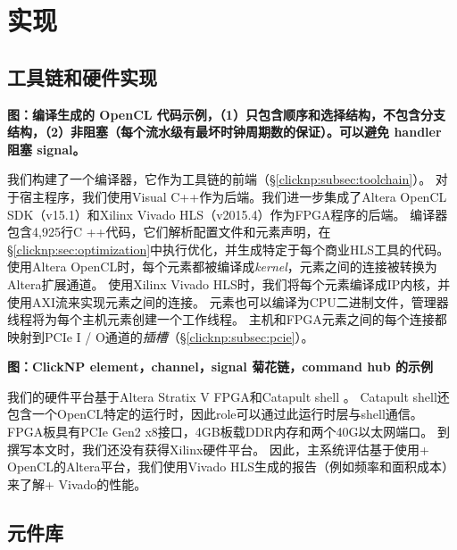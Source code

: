\section{实现}
\label{clicknp:sec:impl}

\subsection{\name 工具链和硬件实现}

\textbf{图：编译生成的 OpenCL 代码示例，（1）只包含顺序和选择结构，不包含分支结构，（2）非阻塞（每个流水级有最坏时钟周期数的保证）。可以避免 handler 阻塞 signal。}

我们构建了一个\name 编译器，它作为\name 工具链的前端（\S \ref {clicknp:subsec:toolchain}）。
对于宿主程序，我们使用Visual C++作为后端。我们进一步集成了Altera OpenCL SDK（v15.1）\cite {aoc}和Xilinx Vivado HLS（v2015.4）\cite {vivado}作为FPGA程序的后端。
\name 编译器包含4,925行C ++代码，它们解析配置文件和元素声明，在\S \ref {clicknp:sec:optimization}中执行优化，并生成特定于每个商业HLS工具的代码。
使用Altera OpenCL时，每个\name 元素都被编译成\textit {kernel}，元素之间的连接被转换为Altera扩展通道。
使用Xilinx Vivado HLS时，我们将每个元素编译成IP内核，并使用AXI流来实现元素之间的连接。
元素也可以编译为CPU二进制文件，管理器线程将为每个主机元素创建一个工作线程。
主机和FPGA元素之间的每个连接都映射到PCIe I / O通道的\textit {插槽}（\S \ref {clicknp:subsec:pcie}）。

\textbf{图：ClickNP element，channel，signal 菊花链，command hub 的示例}

我们的硬件平台基于Altera Stratix V FPGA和Catapult shell \cite {putnam2014reconfigurable}。
Catapult shell还包含一个OpenCL特定的运行时，因此\name role可以通过此运行时层与shell通信。
FPGA板具有PCIe Gen2 x8接口，4GB板载DDR内存和两个40G以太网端口。
到撰写本文时，我们还没有获得Xilinx硬件平台。
因此，主系统评估基于使用\name + OpenCL的Altera平台，我们使用Vivado HLS生成的报告（例如频率和面积成本）来了解\name + Vivado的性能。

\subsection{\name 元件库}
\label{clicknp:subsec:lib}

